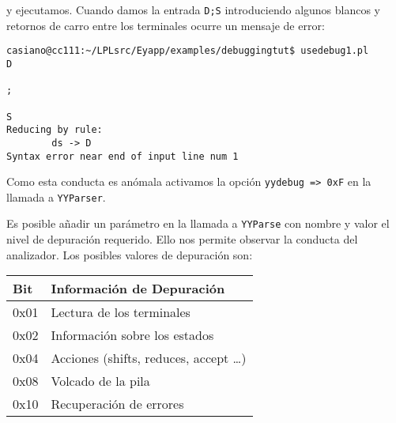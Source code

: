 y ejecutamos. 
Cuando damos la entrada \verb|D;S| introduciendo algunos blancos y retornos de carro
entre los terminales ocurre un mensaje de error:
\begin{verbatim}
casiano@cc111:~/LPLsrc/Eyapp/examples/debuggingtut$ usedebug1.pl
D

;

S
Reducing by rule:
        ds -> D
Syntax error near end of input line num 1
\end{verbatim}
Como esta  conducta es anómala activamos  la opción \verb|yydebug => 0xF| 
en la llamada a \verb|YYParser|.

Es posible añadir un parámetro en la llamada a \verb|YYParse|
con nombre  y valor el nivel de depuración requerido.
Ello 
nos permite observar la conducta del analizador. Los 
posibles valores de depuración son:

\vspace{0.5cm}
\begin{center}
\begin{tabular}{|l|l|}
\hline
   Bit      &    Información de Depuración \\
\hline
    0x01    &    Lectura de los terminales\\
\hline
    0x02    &    Información sobre los estados\\
\hline
    0x04    &    Acciones (shifts, reduces, accept \ldots)\\
\hline
    0x08    &    Volcado de la pila\\
\hline
    0x10    &    Recuperación de errores\\
\hline
\end{tabular}
\end{center}
\vspace{0.5cm}
 

